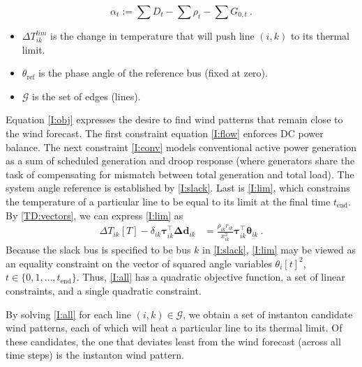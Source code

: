 \documentclass[conference]{IEEEtran}
\begin{document}
\[\alpha_t:= \sum D_t - \sum \rho_t - \sum G_{0,t} ~.\]

\begin{itemize}
\itemsep1pt\parskip0pt
\item $\Delta T_{ik}^{lim}$ is the change in temperature that will push line $(i,k)$ to its thermal limit.
\item $\theta_\text{ref}$ is the phase angle of the reference bus (fixed at zero).
\item $\mathcal{G}$ is the set of edges (lines).
\end{itemize}




Equation \eqref{I:obj} expresses the desire to find wind patterns that remain close to the wind forecast. The first constraint equation \eqref{I:flow} enforces DC power balance. The next constraint \eqref{I:conv} models conventional active power generation as a sum of
scheduled generation and droop response (where generators share the task of compensating for mismatch between total generation and total load). The system angle reference is established by \eqref{I:slack}. Last is \eqref{I:lim}, which constrains the temperature of a particular line to be equal to its limit at the final time $t_\text{end}$. By \eqref{TD:vectors}, we can express \eqref{I:lim} as
\begin{align}\label{temp}
\Delta T_{ik}[T] - \delta_{ik} \boldsymbol{\tau}_{ik}^\top \boldsymbol{\Delta d}_{ik}  &= \frac{\rho_{ik}r_{ik}}{x_{ik}^2} \boldsymbol{\tau}_{ik}^\top \boldsymbol{\theta}_{ik}~.
\end{align}
Because the slack bus is specified to be bus $k$ in \eqref{I:slack}, \eqref{I:lim} may be viewed as an equality constraint on the vector of squared angle variables $\theta_i[t]^2$, $t\in \{0,1,\ldots,t_\text{end}\}$. Thus, \eqref{I:all} has a quadratic objective function, a set of linear constraints, and a single quadratic constraint.

By solving \eqref{I:all} for each line $(i,k)\in\mathcal G$, we obtain a set of instanton candidate wind patterns, each of which will heat a particular line to its thermal limit. Of these candidates, the one that deviates least from the wind forecast (across all time steps) is the instanton wind pattern.
\end{document}
